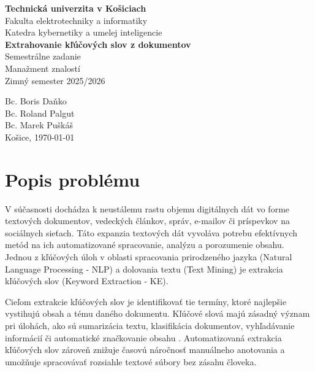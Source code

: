 \documentclass[a4paper,12pt]{article}
\begin{document}
\begin{titlepage}
    \centering
    {\Large \textbf{Technická univerzita v Košiciach}}\\[0.3em]
    {\large Fakulta elektrotechniky a informatiky}\\[0.3em]
    {\large Katedra kybernetiky a umelej inteligencie}\\[2cm]
    
    \vspace*{\fill}
    {\huge \textbf{Extrahovanie kľúčových slov z dokumentov}}\\[1cm]
    {\Large Semestrálne zadanie}\\[0.3em]
    {\large Manažment znalostí}\\
    {\large Zimný semester 2025/2026}\\
    \vspace*{\fill}
    
    \begin{flushright}
        {\large Bc. Boris Daňko}\\
        {\large Bc. Roland Palgut}\\
        {\large Bc. Marek Puškáš}\\[1cm]
        {\large Košice, \today}
    \end{flushright}
\end{titlepage}

\tableofcontents
\newpage
\setcounter{tocdepth}{2}

\section{Popis problému}
V súčasnosti dochádza k neustálemu rastu objemu digitálnych dát vo forme textových dokumentov, vedeckých článkov, správ, e-mailov či príspevkov na sociálnych sieťach. Táto expanzia textových dát vyvoláva potrebu efektívnych metód na ich automatizované spracovanie, analýzu a porozumenie obsahu. Jednou z kľúčových úloh v oblasti spracovania prirodzeného jazyka (Natural Language Processing - NLP) a dolovania textu (Text Mining) je extrakcia kľúčových slov (Keyword Extraction - KE). 

Cieľom extrakcie kľúčových slov je identifikovať tie termíny, ktoré najlepšie vystihujú obsah a tému daného dokumentu. Kľúčové slová majú zásadný význam pri úlohách, ako sú sumarizácia textu, klasifikácia dokumentov, vyhľadávanie informácií či automatické značkovanie obsahu \cite{rose2010automatic}. Automatizovaná extrakcia kľúčových slov zároveň znižuje časovú náročnosť manuálneho anotovania a umožňuje spracovávať rozsiahle textové súbory bez zásahu človeka.
\end{document}
